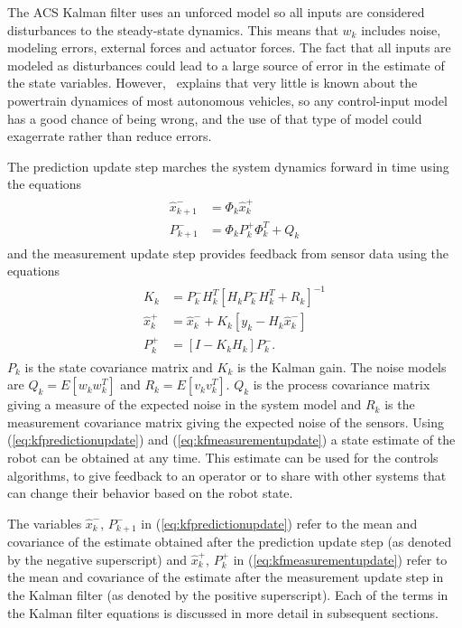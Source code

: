 The ACS Kalman filter uses an unforced model so all inputs are considered disturbances to the steady-state dynamics.
This means that $w_k$ includes noise, modeling errors, external forces and actuator forces.
The fact that all inputs are modeled as disturbances could lead to a large source of error in the estimate of the state variables.
However,~\cite{Kelly_1994_338} explains that very little is known about the powertrain dynamices of most autonomous vehicles, so any control-input model has a good chance of being wrong, and the use of that type of model could exagerrate rather than reduce errors.

The prediction update step marches the system dynamics forward in time using the equations
\begin{align}
\label{eq:kfpredictionupdate}
\begin{split}
\hat{x}_{k+1}^- &= \Phi_k\hat{x}_k^+ \\
P_{k+1}^- &= \Phi_k P_k^+\Phi_k^T + Q_k
\end{split}
\end{align}
and the measurement update step provides feedback from sensor data using the equations
\begin{align}
\label{eq:kfmeasurementupdate}
\begin{split}
K_k &= P_k^-H_k^T{\left[H_k P_k^- H_k^T + R_k\right]}^{-1} \\
\hat{x}_k^+ &= \hat{x}_k^- + K_k\left[y_k - H_k\hat{x}_k^-\right] \\
P_k^+ &= \left[I - K_k H_k \right]P_k^-.
\end{split}
\end{align}
$P_k$ is the state covariance matrix and $K_k$ is the Kalman gain.
The noise models are $Q_k = E[w_k w_k^T]$ and $R_k = E[v_k v_k^T]$.
$Q_k$ is the process covariance matrix giving a measure of the expected noise in the system model and $R_k$ is the measurement covariance matrix giving the expected noise of the sensors.
Using (\ref{eq:kfpredictionupdate}) and (\ref{eq:kfmeasurementupdate}) a state estimate of the robot can be obtained at any time.
This estimate can be used for the controls algorithms, to give feedback to an operator or to share with other systems that can change their behavior based on the robot state.

The variables $\hat{x}_k^-$, $P_{k+1}^-$ in (\ref{eq:kfpredictionupdate}) refer to the mean and covariance of the estimate obtained after the prediction update step (as denoted by the negative superscript) and $\hat{x}_k^+$, $P_{k}^+$ in (\ref{eq:kfmeasurementupdate}) refer to the mean and covariance of the estimate after the measurement update step in the Kalman filter (as denoted by the positive superscript).
Each of the terms in the Kalman filter equations is discussed in more detail in subsequent sections.


